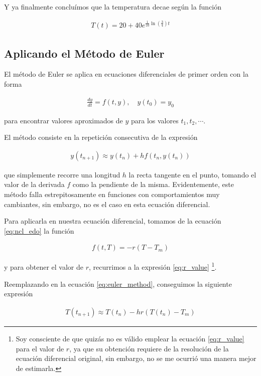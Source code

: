 \documentclass[letter]{tufte-handout} %
\begin{document}
Y ya finalmente concluímos que la temperatura decae según la función

\begin{align*}
	T(t) = 20 + 40e^{\frac{1}{10}\ln\left(\frac{3}{4}\right)t}
\end{align*}



\subsection{Aplicando el Método de Euler}
El método de Euler se aplica en ecuaciones diferenciales de primer orden con la forma

\begin{align*}
	\frac{dy}{dt} = f(t, y), \quad y(t_0) = y_0
\end{align*}

para encontrar valores aproximados de $y$ para los valores $t_1, t_2, \cdots$.

El método consiste en la repetición consecutiva de la expresión

\begin{align}
	y(t_{n+1}) \approx y(t_n) + hf(t_n, y(t_n)) \label{eq:euler_method}
\end{align}

que simplemente recorre una longitud $h$ la recta tangente en el punto, tomando el valor de
la derivada $f$ como la pendiente de la misma. Evidentemente, este método falla
estrepitosamente en funciones con comportamientos muy cambiantes, sin embargo, no
es el caso en esta ecuación diferencial.

Para aplicarla en nuestra ecuación diferencial, tomamos de la ecuación \eqref{eq:ncl_edo} la
función

\begin{align}
	f(t, T) = -r(T - T_m)
\end{align}

y para obtener el valor de $r$, recurrimos a la expresión \eqref{eq:r_value}
\footnote{Soy consciente de que quizás no es válido emplear la ecuación \eqref{eq:r_value} para
	el valor de $r$, ya que su obtención requiere de la resolución de la ecuación diferencial original,
	sin embargo, no se me ocurrió una manera mejor de estimarla.}.

Reemplazando en la ecuación \eqref{eq:euler_method}, conseguimos la siguiente expresión

\begin{align}
	T(t_{n+1}) \approx T(t_n) - hr(T(t_n) - T_m)
\end{align}
\end{document}
